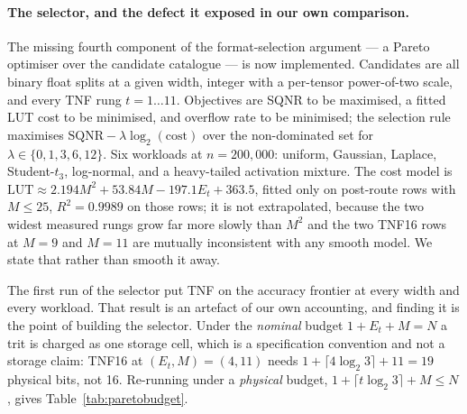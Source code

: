 \documentclass[11pt]{article}
\theoremstyle{definition}
\begin{document}
\paragraph{The selector, and the defect it exposed in our own comparison.}
The missing fourth component of the format-selection argument --- a Pareto
optimiser over the candidate catalogue --- is now implemented. Candidates are all
binary float splits at a given width, integer with a per-tensor power-of-two
scale, and every TNF rung $t = 1 \ldots 11$. Objectives are SQNR to be maximised,
a fitted LUT cost to be minimised, and overflow rate to be minimised; the
selection rule maximises $\mathrm{SQNR} - \lambda\log_2(\mathrm{cost})$ over the
non-dominated set for $\lambda \in \{0,1,3,6,12\}$. Six workloads at
$n = 200{,}000$: uniform, Gaussian, Laplace, Student-$t_3$, log-normal, and a
heavy-tailed activation mixture. The cost model is
$\mathrm{LUT} \approx 2.194 M^2 + 53.84 M - 197.1 E_t + 363.5$, fitted only on
post-route rows with $M \le 25$, $R^2 = 0.9989$ on those rows; it is not
extrapolated, because the two widest measured rungs grow far more slowly than
$M^2$ and the two TNF16 rows at $M = 9$ and $M = 11$ are mutually inconsistent
with any smooth model. We state that rather than smooth it away.

The first run of the selector put TNF on the accuracy frontier at every width and
every workload. That result is an artefact of our own accounting, and finding it
is the point of building the selector. Under the \emph{nominal} budget
$1 + E_t + M = N$ a trit is charged as one storage cell, which is a specification
convention and not a storage claim: TNF16 at $(E_t,M) = (4,11)$ needs
$1 + \lceil 4\log_2 3\rceil + 11 = 19$ physical bits, not 16. Re-running under a
\emph{physical} budget, $1 + \lceil t\log_2 3\rceil + M \le N$, gives
Table~\ref{tab:paretobudget}.
\end{document}
